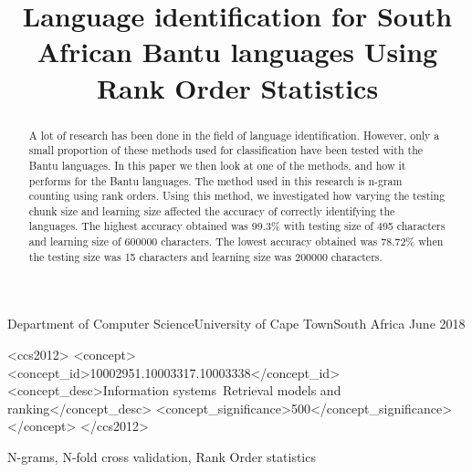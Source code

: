 \documentclass[plain]{sigplanconf}
\begin{document}
	\title{Language identification for South African Bantu languages Using Rank Order Statistics}
	{Department of Computer Science\linebreak University of Cape Town\linebreak South Africa}
	{June 2018}
	\maketitle
	\begin{abstract}
		A lot of research has been done in the field of language identification. However, only a small proportion of these methods used for classification have been tested with the Bantu languages. In this paper we then look at one of the methods, and how it performs for the Bantu languages. The method used in this research is n-gram counting using rank orders. Using this method, we investigated how varying the testing chunk size and learning size affected the accuracy of correctly identifying the languages. The highest accuracy obtained was 99.3\% with testing size of 495 characters and learning size of 600000 characters. The lowest accuracy obtained was 78.72\% when the testing size was 15 characters and learning size was 200000 characters.  
	\end{abstract}
	\begin{CCSXML}
		<ccs2012>
		<concept>
		<concept_id>10002951.10003317.10003338</concept_id>		
		<concept_desc>Information systems~Retrieval models and ranking</concept_desc>
		<concept_significance>500</concept_significance>
		</concept>
		</ccs2012>
	\end{CCSXML}
	\keywords
	N-grams, N-fold cross validation, Rank Order statistics
	
	
	\nocite{*}
	
	
\end{document}
